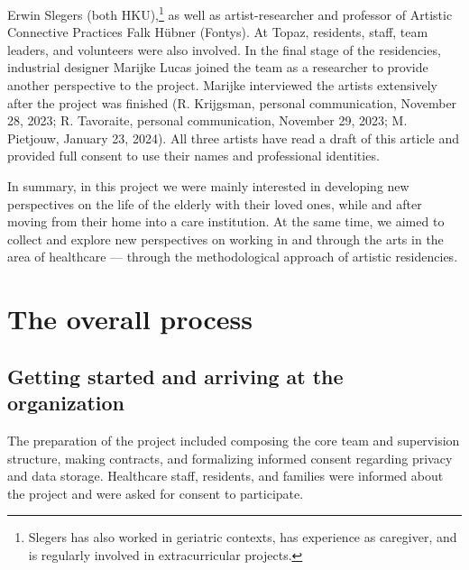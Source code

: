 \documentclass[authordate, empirical]{jote-new-article}
\begin{document}
Erwin Slegers (both HKU),\footnote{ Slegers has also worked in geriatric contexts, has experience as caregiver, and is regularly involved in extracurricular projects. } as well as artist-researcher and professor of Artistic Connective Practices Falk Hübner (Fontys). At Topaz, residents, staff, team leaders, and volunteers were also involved. In the final stage of the residencies, industrial designer Marijke Lucas joined the team as a researcher to provide another perspective to the project. Marijke interviewed the artists extensively after the project was finished (R. Krijgsman, personal communication, November 28, 2023; R. Tavoraite, personal communication, November 29, 2023; M. Pietjouw, January 23, 2024). All three artists have read a draft of this article and provided full consent to use their names and professional identities.







	In summary, in this project we were mainly interested in developing new perspectives on the life of the elderly with their loved ones, while and after moving from their home into a care institution. At the same time, we aimed to collect and explore new perspectives on working in and through the arts in the area of healthcare --- through the methodological approach of artistic residencies.







	\section{The overall process}



	\subsection{Getting started and arriving at the organization }



	The preparation of the project included composing the core team and supervision structure, making contracts, and formalizing informed consent regarding privacy and data storage. Healthcare staff, residents, and families were informed about the project and were asked for consent to participate.
\end{document}
